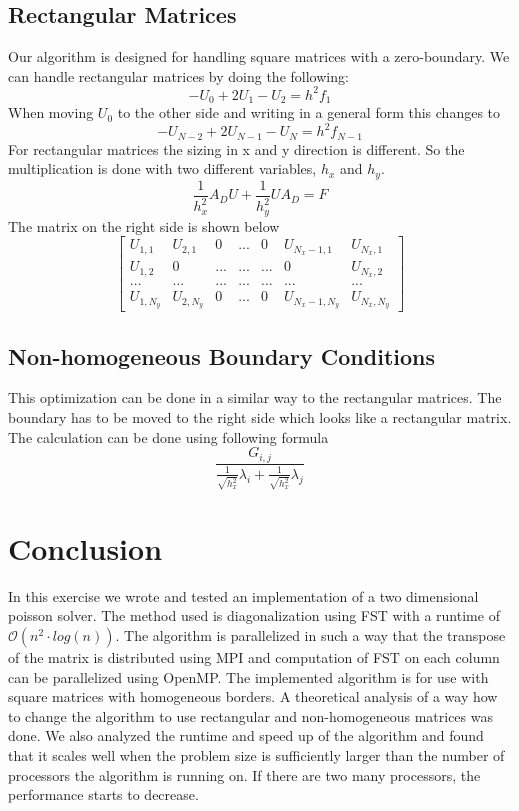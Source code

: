 \documentclass{article}
\begin{document}
\subsection{Rectangular Matrices}
Our algorithm is designed for handling square matrices with a zero-boundary. We can handle rectangular matrices by doing the following:
\begin{equation}
-U_0+2U_1-U_2=h^2f_1
\end{equation}
When moving $U_0$ to the other side and writing in a general form this changes to
\begin{equation}
-U_{N-2}+2U_{N-1}-U_N=h^2f_{N-1}
\end{equation}
For rectangular matrices the sizing in x and y direction is different. So the multiplication is done with two different variables, $h_x$ and $h_y$.
\begin{equation}
\frac{1}{h_x^2}A_DU+\frac{1}{h_y^2}UA_D=F
\end{equation}
The matrix on the right side is shown below
$$
\begin{bmatrix}
U_{1,1} & U_{2,1} & 0 & ... & 0 & U_{N_x-1,1} & U_{N_x,1} \\
U_{1,2} & 0 & ... & ... & ... & 0 & U_{N_x,2} \\
... & ... & ... & ... &... & ... & ... \\
U_{1,N_y} & U_{2,N_y} & 0 & ... & 0 & U_{N_x-1,N_y} & U_{N_x,N_y} 
\end{bmatrix}
$$
\subsection{Non-homogeneous Boundary Conditions}
This optimization can be done in a similar way to the rectangular matrices. The boundary has to be moved to the right side which looks like a rectangular matrix. The calculation can be done using following formula
\begin{equation}
\frac{G_{i,j}}{\frac{1}{\sqrt{h_x^2}}\lambda_i+\frac{1}{\sqrt{h_x^2}}\lambda_j}
\end{equation}
\newpage
\section{Conclusion}
In this exercise we wrote and tested an implementation of a two dimensional poisson solver. The method used is diagonalization using FST with a runtime of $\mathcal{O}(n^2\cdot log(n))$. The algorithm is parallelized in such a way that the transpose of the matrix is distributed using MPI and computation of FST on each column can be parallelized using OpenMP. The implemented algorithm is for use with square matrices with homogeneous borders. A theoretical analysis of a way how to change the algorithm to use rectangular and non-homogeneous matrices was done. We also analyzed the runtime and speed up of the algorithm and found that it scales well when the problem size is sufficiently larger than the number of processors the algorithm is running on. If there are two many processors, the performance starts to decrease.
\end{document}
